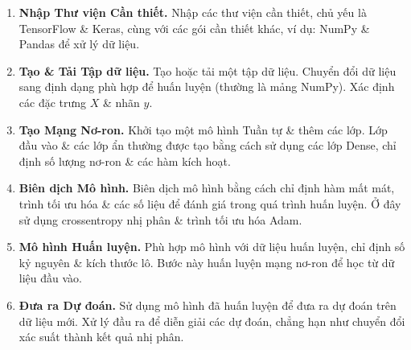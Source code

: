 \documentclass{article}
\begin{document}
\begin{enumerate}
    \item {\bf Nhập Thư viện Cần thiết.} Nhập các thư viện cần thiết, chủ yếu là TensorFlow \& Keras, cùng với các gói cần thiết khác, ví dụ: NumPy \& Pandas để xử lý dữ liệu.
    \item {\bf Tạo \& Tải Tập dữ liệu.} Tạo hoặc tải một tập dữ liệu. Chuyển đổi dữ liệu sang định dạng phù hợp để huấn luyện (thường là mảng NumPy). Xác định các đặc trưng $X$ \& nhãn $y$.
    \item {\bf Tạo Mạng Nơ-ron.} Khởi tạo một mô hình Tuần tự \& thêm các lớp. Lớp đầu vào \& các lớp ẩn thường được tạo bằng cách sử dụng các lớp Dense, chỉ định số lượng nơ-ron \& các hàm kích hoạt.
    \item {\bf Biên dịch Mô hình.} Biên dịch mô hình bằng cách chỉ định hàm mất mát, trình tối ưu hóa \& các số liệu để đánh giá trong quá trình huấn luyện. Ở đây sử dụng crossentropy nhị phân \& trình tối ưu hóa Adam.
    \item {\bf Mô hình Huấn luyện.} Phù hợp mô hình với dữ liệu huấn luyện, chỉ định số kỷ nguyên \& kích thước lô. Bước này huấn luyện mạng nơ-ron để học từ dữ liệu đầu vào.
    \item {\bf Đưa ra Dự đoán.} Sử dụng mô hình đã huấn luyện để đưa ra dự đoán trên dữ liệu mới. Xử lý đầu ra để diễn giải các dự đoán, chẳng hạn như chuyển đổi xác suất thành kết quả nhị phân.
\end{enumerate}

\end{document}
